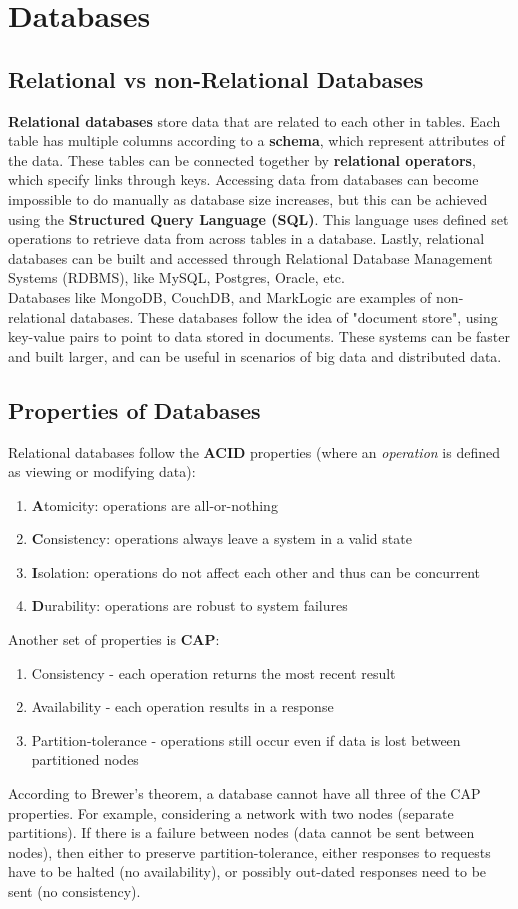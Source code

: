 \documentclass[12pt]{article}
\begin{document}
\section{Databases}
\subsection{Relational vs non-Relational Databases}
{\bf Relational databases} store data that are related to each other in tables. Each table has multiple columns according to a {\bf schema}, which represent attributes of the data. These tables can be connected together by {\bf relational operators}, which specify links through keys. Accessing data from databases can become impossible to do manually as database size increases, but this can be achieved using the {\bf Structured Query Language (SQL)}. This language uses defined set operations to retrieve data from across tables in a database. Lastly, relational databases can be built and accessed through Relational Database Management Systems (RDBMS), like MySQL, Postgres, Oracle, etc.\\[10pt]
Databases like MongoDB, CouchDB, and MarkLogic are examples of non-relational databases. These databases follow the idea of "document store", using key-value pairs to point to data stored in documents. These systems can be faster and built larger, and can be useful in scenarios of big data and distributed data. 

\subsection{Properties of Databases}
Relational databases follow the {\bf ACID} properties (where an \textit{operation} is defined as viewing or modifying data):
\begin{enumerate}
    \item {\bf A}tomicity: operations are all-or-nothing
    \item {\bf C}onsistency: operations always leave a system in a valid state
    \item {\bf I}solation: operations do not affect each other and thus can be concurrent
    \item {\bf D}urability: operations are robust to system failures
\end{enumerate}
Another set of properties is {\bf CAP}:
\begin{enumerate}
    \item Consistency - each operation returns the most recent result
    \item Availability - each operation results in a response
    \item Partition-tolerance - operations still occur even if data is lost between partitioned nodes
\end{enumerate}
According to Brewer's theorem, a database cannot have all three of the CAP properties. For example, considering a network with two nodes (separate partitions). If there is a failure between nodes (data cannot be sent between nodes), then either to preserve partition-tolerance, either responses to requests have to be halted (no availability), or possibly out-dated responses need to be sent (no consistency).
\end{document}
